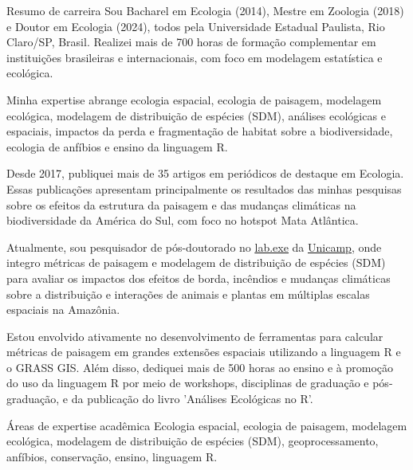 \documentclass{resume}
\begin{document}

\begin{rSection}{Resumo de carreira}
Sou Bacharel em Ecologia (2014), Mestre em Zoologia (2018) e Doutor em Ecologia (2024), todos pela Universidade Estadual Paulista, Rio Claro/SP, Brasil. Realizei mais de 700 horas de formação complementar em instituições brasileiras e internacionais, com foco em modelagem estatística e ecológica. 

Minha expertise abrange ecologia espacial, ecologia de paisagem, modelagem ecológica, modelagem de distribuição de espécies (SDM), análises ecológicas e espaciais, impactos da perda e fragmentação de habitat sobre a biodiversidade, ecologia de anfíbios e ensino da linguagem R. 

Desde 2017, publiquei mais de 35 artigos em periódicos de destaque em Ecologia. Essas publicações apresentam principalmente os resultados das minhas pesquisas sobre os efeitos da estrutura da paisagem e das mudanças climáticas na biodiversidade da América do Sul, com foco no hotspot Mata Atlântica. 

Atualmente, sou pesquisador de pós-doutorado no \href{https://www.mathiasmpires.net.br/index.html}{\underline{lab.exe}} da \href{https://unicamp.br/}{\underline{Unicamp}}, onde integro métricas de paisagem e modelagem de distribuição de espécies (SDM) para avaliar os impactos dos efeitos de borda, incêndios e mudanças climáticas sobre a distribuição e interações de animais e plantas em múltiplas escalas espaciais na Amazônia. 

Estou envolvido ativamente no desenvolvimento de ferramentas para calcular métricas de paisagem em grandes extensões espaciais utilizando a linguagem R e o GRASS GIS. Além disso, dediquei mais de 500 horas ao ensino e à promoção do uso da linguagem R por meio de workshops, disciplinas de graduação e pós-graduação, e da publicação do livro 'Análises Ecológicas no R'.
\end{rSection}


\begin{rSection}{Áreas de expertise acadêmica}
Ecologia espacial, ecologia de paisagem, modelagem ecológica, modelagem de distribuição de espécies (SDM), geoprocessamento, anfíbios, conservação, ensino, linguagem R.
\end{rSection}
\end{document}

